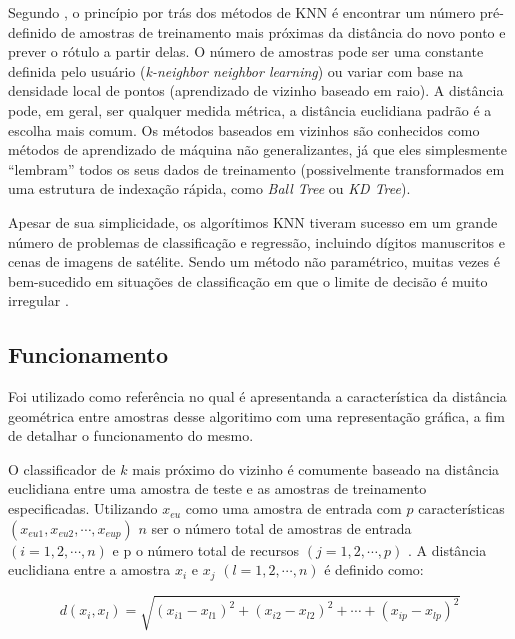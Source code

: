 Segundo \cite{scikitlearn}, o princípio por trás dos métodos de KNN é encontrar um número pré-definido de amostras de treinamento mais próximas da distância do novo ponto e prever o rótulo a partir delas. O número de amostras pode ser uma constante definida pelo usuário (\textit{k-neighbor neighbor learning}) ou variar com base na densidade local de pontos (aprendizado de vizinho baseado em raio). A distância pode, em geral, ser qualquer medida métrica, a distância euclidiana padrão é a escolha mais comum. Os métodos baseados em vizinhos são conhecidos como métodos de aprendizado de máquina não generalizantes, já que eles simplesmente “lembram” todos os seus dados de treinamento (possivelmente transformados em uma estrutura de indexação rápida, como \textit{Ball Tree} ou \textit{KD Tree}).

Apesar de sua simplicidade, os algorítimos KNN tiveram sucesso em um grande número de problemas de classificação e regressão, incluindo dígitos manuscritos e cenas de imagens de satélite. Sendo um método não paramétrico, muitas vezes é bem-sucedido em situações de classificação em que o limite de decisão é muito irregular \cite{scikitlearn}.

\subsection{Funcionamento}

Foi utilizado como referência \cite{peterson2009k} no qual é apresentanda a característica da distância geométrica entre amostras desse algoritimo com uma representação gráfica, a fim de detalhar o funcionamento do mesmo.

O classificador de $ k $ mais próximo do vizinho é comumente baseado na distância euclidiana entre uma amostra de teste e as amostras de treinamento especificadas. Utilizando $ x_{eu} $ como uma amostra de entrada com $ p $ características $ (x_{eu1},x_{eu2},\cdots ,x_{eup}) $ $ n $ ser o número total de amostras de entrada $ (i=1,2,\cdots,n) $ e p o número total de recursos $ (j=1,2,\cdots,p) $ . A distância euclidiana entre a amostra $ x_{i} $ e $ x_{j} $ $ (l=1,2,\cdots,n) $  é definido como:

\begin{equation} \label{eq:diseuclidiana}
    d(x_{i},x_{l})=\sqrt{(x_{i1}-x_{l1})^{2}+(x_{i2}-x_{l2})^{2}+\cdots+(x_{ip}-x_{lp})^{2}}
\end{equation}


